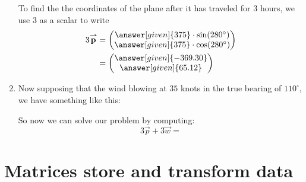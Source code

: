 \documentclass{ximera}
\begin{document}
\begin{example}[Navigation]
\begin{explanation}
\begin{enumerate}
To find the the coordinates of the plane after it has traveled for $3$
hours, we use $3$ as a scalar to write
\begin{align*}
  3\vec{p} &= \begin{pmatrix}\answer[given]{375}\cdot \sin(280^\circ)\\ \answer[given]{375} \cdot \cos(280^\circ)\end{pmatrix}\\
  &= \begin{pmatrix}\answer[given]{-369.30}\\ \answer[given]{65.12} \end{pmatrix}\\
\end{align*}
\item Now supposing that the wind blowing at $35$ knots in the true
  bearing of $110^\circ$, we have something like this:
  \begin{center}
  \end{center}
  So now we can solve our problem by computing:
  \[
  3\vec{p} + 3 \vec{w} =
  \]
\end{enumerate}
\end{explanation}
\end{example}



\section{Matrices store and transform data}
\end{document}
